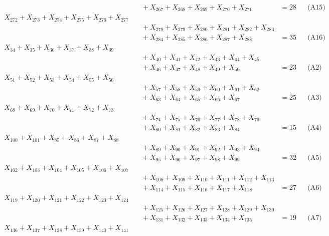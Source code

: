 \documentclass[a4paper,10pt]{article}
\begin{document}
{\begin{align}
&\quad  + X_{267} + X_{268} + X_{269} + X_{270} + X_{271} &= 28 && \text{(A15)} \\
X_{272} + X_{273} + X_{274} + X_{275} + X_{276} + X_{277} \\[0.5ex]
&\quad  + X_{278} + X_{279} + X_{280} + X_{281} + X_{282} + X_{283} \\[0.5ex]
&\quad  + X_{284} + X_{285} + X_{286} + X_{287} + X_{288} &= 35 && \text{(A16)} \\
X_{34} + X_{35} + X_{36} + X_{37} + X_{38} + X_{39} \\[0.5ex]
&\quad  + X_{40} + X_{41} + X_{42} + X_{43} + X_{44} + X_{45} \\[0.5ex]
&\quad  + X_{46} + X_{47} + X_{48} + X_{49} + X_{50} &= 23 && \text{(A2)} \\
X_{51} + X_{52} + X_{53} + X_{54} + X_{55} + X_{56} \\[0.5ex]
&\quad  + X_{57} + X_{58} + X_{59} + X_{60} + X_{61} + X_{62} \\[0.5ex]
&\quad  + X_{63} + X_{64} + X_{65} + X_{66} + X_{67} &= 25 && \text{(A3)} \\
X_{68} + X_{69} + X_{70} + X_{71} + X_{72} + X_{73} \\[0.5ex]
&\quad  + X_{74} + X_{75} + X_{76} + X_{77} + X_{78} + X_{79} \\[0.5ex]
&\quad  + X_{80} + X_{81} + X_{82} + X_{83} + X_{84} &= 15 && \text{(A4)} \\
X_{100} + X_{101} + X_{85} + X_{86} + X_{87} + X_{88} \\[0.5ex]
&\quad  + X_{89} + X_{90} + X_{91} + X_{92} + X_{93} + X_{94} \\[0.5ex]
&\quad  + X_{95} + X_{96} + X_{97} + X_{98} + X_{99} &= 32 && \text{(A5)} \\
X_{102} + X_{103} + X_{104} + X_{105} + X_{106} + X_{107} \\[0.5ex]
&\quad  + X_{108} + X_{109} + X_{110} + X_{111} + X_{112} + X_{113} \\[0.5ex]
&\quad  + X_{114} + X_{115} + X_{116} + X_{117} + X_{118} &= 27 && \text{(A6)} \\
X_{119} + X_{120} + X_{121} + X_{122} + X_{123} + X_{124} \\[0.5ex]
&\quad  + X_{125} + X_{126} + X_{127} + X_{128} + X_{129} + X_{130} \\[0.5ex]
&\quad  + X_{131} + X_{132} + X_{133} + X_{134} + X_{135} &= 19 && \text{(A7)} \\
X_{136} + X_{137} + X_{138} + X_{139} + X_{140} + X_{141} \\[0.5ex]

\end{align}}
\end{document}
